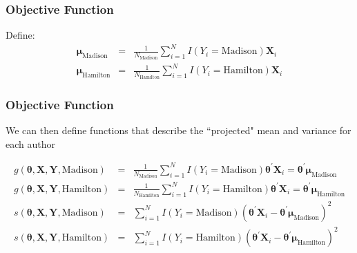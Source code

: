 \documentclass{beamer}
\numberwithin{equation}{section}
\begin{document}
\begin{frame}
\frametitle{Objective Function}



Define:
\begin{eqnarray}
\boldsymbol{\mu}_{\text{Madison}} & = & \frac{1}{N_{\text{Madison}}} \sum_{i=1}^{N} I(Y_{i} = \text{Madison}) \boldsymbol{X}_{i} \nonumber \\
\boldsymbol{\mu}_{\text{Hamilton}} & = & \frac{1}{N_{\text{Hamilton}}} \sum_{i=1}^{N} I(Y_{i} = \text{Hamilton}) \boldsymbol{X}_{i} \nonumber
\end{eqnarray}









\end{frame}



\begin{frame}
\frametitle{Objective Function}

\begin{small}

We can then define functions that describe the ``projected" mean and variance for each author

\begin{eqnarray}
g(\boldsymbol{\theta}, \boldsymbol{X}, \boldsymbol{Y},  \text{Madison}) & = & \frac{1}{N_{\text{Madison}}} \sum_{i= 1}^{N}  I(Y_{i} = \text{Madison} ) \boldsymbol{\theta}^{'}\boldsymbol{X}_{i}  = \boldsymbol{\theta}^{'} \boldsymbol{\mu}_{\text{Madison}} \nonumber  \\
g(\boldsymbol{\theta}, \boldsymbol{X}, \boldsymbol{Y},  \text{Hamilton}) & = & \frac{1}{N_{\text{Hamilton}}} \sum_{i= 1}^{N}  I(Y_{i} = \text{Hamilton} ) \boldsymbol{\theta}^{'}\boldsymbol{X}_{i}  = \boldsymbol{\theta}^{'} \boldsymbol{\mu}_{\text{Hamilton}} \nonumber  \\
s(\boldsymbol{\theta}, \boldsymbol{X}, \boldsymbol{Y},  \text{Madison}) & = & \sum_{i=1}^{N} I(Y_{i} = \text{Madison} ) (\boldsymbol{\theta}^{'} \boldsymbol{X}_{i} - \boldsymbol{\theta}^{'} \boldsymbol{\mu}_{\text{Madison}})^2 \nonumber \\
s(\boldsymbol{\theta}, \boldsymbol{X}, \boldsymbol{Y},  \text{Hamilton}) & = & \sum_{i=1}^{N} I(Y_{i} = \text{Hamilton} ) (\boldsymbol{\theta}^{'} \boldsymbol{X}_{i} - \boldsymbol{\theta}^{'} \boldsymbol{\mu}_{\text{Hamilton}})^2 \nonumber
\end{eqnarray}


\end{small}


\end{frame}
\end{document}

